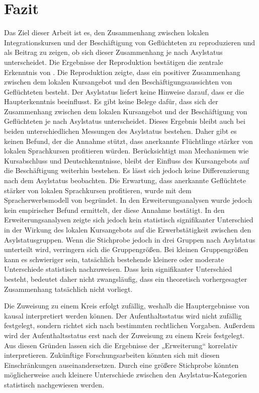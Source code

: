  
 
 \section{Fazit}
 \label{sec: fazit}
 
 Das Ziel dieser Arbeit ist es, den Zusammenhang zwischen lokalen Integrationskursen und der Beschäftigung von Geflüchteten zu reproduzieren und als Beitrag zu zeigen, ob sich dieser Zusammenhang je nach Asylstatus unterscheidet. Die Ergebnisse der Reproduktion bestätigen die zentrale Erkenntnis von \textcite{Kanas:2023}. Die Reproduktion zeigte, dass ein positiver Zusammenhang zwischen dem lokalen Kursangebot und den Beschäftigungsaussichten von Geflüchteten besteht. Der Asylstatus liefert keine Hinweise darauf, dass er die Haupterkenntnis beeinflusst. Es gibt keine Belege dafür, dass sich der Zusammenhang zwischen dem lokalen Kursangebot und der Beschäftigung von Geflüchteten je nach Asylstatus unterscheidet. Dieses Ergebnis bleibt auch bei beiden unterschiedlichen Messungen des Asylstatus bestehen. Daher gibt es keinen Befund, der die Annahme stützt, dass anerkannte Flüchtlinge stärker von lokalen Sprachkursen profitieren würden. Berücksichtigt man Mechanismen wie Kursabschluss und Deutschkenntnisse, bleibt der Einfluss des Kursangebots auf die Beschäftigung weiterhin bestehen. Es lässt sich jedoch keine Differenzierung nach dem Asylstatus beobachten.
 Die Erwartung, dass anerkannte Geflüchtete stärker von lokalen Sprachkursen profitieren, wurde mit dem Spracherwerbsmodell von \textcite{Esser:2006} begründet. In den Erweiterungsanalysen wurde jedoch kein empirischer Befund ermittelt, der diese Annahme bestätigt. In den Erweiterungsanalysen zeigte sich jedoch kein statistisch signifikanter Unterschied in der Wirkung des lokalen Kursangebots auf die Erwerbstätigkeit zwischen den Asylstatusgruppen. Wenn die Stichprobe jedoch in drei Gruppen nach Asylstatus unterteilt wird, verringern sich die Gruppengrößen. Bei kleinen Gruppengrößen kann es schwieriger sein, tatsächlich bestehende kleinere oder moderate Unterschiede statistisch nachzuweisen. Dass kein signifikanter Unterschied besteht, bedeutet daher nicht zwangsläufig, dass ein theoretisch vorhergesagter Zusammenhang tatsächlich nicht vorliegt.
 
 Die Zuweisung zu einem Kreis erfolgt zufällig, weshalb die Hauptergebnisse von \textcite{Kanas:2023} kausal interpretiert werden können. Der Aufenthaltsstatus wird nicht zufällig festgelegt, sondern richtet sich nach bestimmten rechtlichen Vorgaben. Außerdem wird der Aufenthaltsstatus erst nach der Zuweisung zu einem Kreis festgelegt. Aus diesen Gründen lassen sich die Ergebnisse der „Erweiterung“ korrelativ interpretieren. Zukünftige Forschungsarbeiten könnten sich mit diesen Einschränkungen auseinandersetzen. Durch eine größere Stichprobe könnten möglicherweise auch kleinere Unterschiede zwischen den Asylstatus-Kategorien statistisch nachgewiesen werden.
 
 
 
 
 
 
 
 
 
 
 
 
 
 
 
 
 